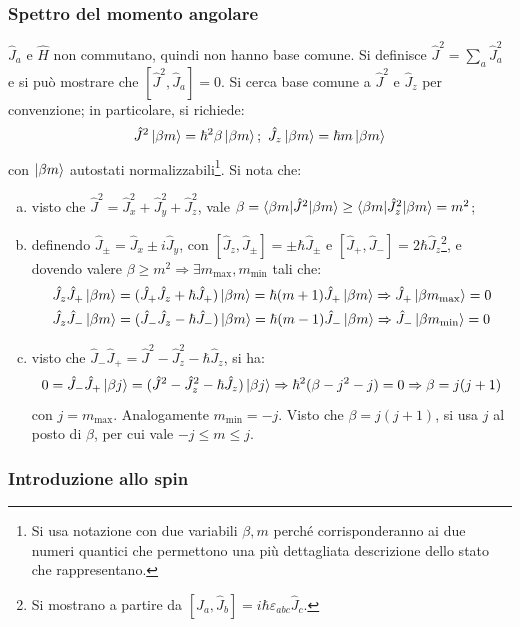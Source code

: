 \documentclass[11pt, a4paper]{scrartcl} %
\numberwithin{equation}{subsection}
\theoremstyle{style2}
\theoremstyle{style1}
\begin{document}
\subsubsection{Spettro del momento angolare}
$\hat{J}_a$ e $\hat{H}$ non commutano, quindi non hanno base comune. Si definisce $\hat{J }^2 = \sum_{a}^{} \hat{J}_a^2 $ e si pu\`o mostrare che $[\hat{J}^2 , \hat{J}_a] = 0$. Si cerca base comune a $\hat{J}^2$ e $\hat{J}_z$ per convenzione; in particolare, si richiede:
\[
\hat{J}^2 \ket{\beta m} = \hbar^2 \beta  \ket{\beta m} ; \ \hat{J}_z \ket{\beta  m}  = \hbar m \ket{\beta  m } 
\] 
con $\ket{\beta m} $ autostati normalizzabili\footnote{Si usa notazione con due variabili $\beta , m$ perch\'e corrisponderanno ai due numeri quantici che permettono una pi\`u dettagliata descrizione dello stato che rappresentano.}. Si nota che:
\begin{enumerate}[(a).]
	\item visto che $\hat{J}^2 = \hat{J}^2_x + \hat{J}^2 _y + \hat{J}^2_z$, vale $\beta = \braket{\beta  m |\hat{J}^2|\beta m} \ge \braket{\beta m|\hat{J}_z^2|\beta  m } = m^2$;
	\item definendo $\hat{J}_{\pm} = \hat{J}_x \pm i\hat{J}_y$, con $[\hat{J}_z , \hat{J}_{\pm} ]=\pm \hbar \hat{J}_{\pm} $ e $[\hat{J}_+, \hat{J}_-] = 2 \hbar \hat{J}_z$\footnote{Si mostrano a partire da $[\hat{J}_a, \hat{J}_b ]= i\hbar  \varepsilon _{abc} \hat{J}_c$.}, e dovendo valere $\beta \ge m^2\Rightarrow \exists m_\text{max}, m_\text{min}$ tali che:
		\[
		\begin{split}
			&\hat{J}_z \hat{J}_+ \ket{\beta  m } = (\hat{J}_+ \hat{J}_z + \hbar \hat{J}_+) \ket{\beta  m}  = \hbar  (m+1) \hat{J}_+ \ket{\beta  m} \Rightarrow \hat{J}_+ \ket{\beta  m_\text{max}} =0\\
			& \hat{J}_z \hat{J}_- \ket{\beta  m } = (\hat{J}_- \hat{J}_z - \hbar \hat{J}_-)\ket{\beta m}  = \hbar  (m-1) \hat{J}_- \ket{\beta m} \Rightarrow \hat{J}_- \ket{\beta  m _\text{min}} =0
		\end{split}
		\] 
	\item visto che $\hat{J}_- \hat{J}_+ = \hat{J}^2 - \hat{J}_z^2 - \hbar \hat{J}_z$, si ha:
		\[
			 0 = \hat{J}_- \hat{J}_+ \ket{\beta  j}  = (\hat{J}^2 - \hat{J}_z^2 - \hbar  \hat{J}_z) \ket{\beta  j } \Rightarrow \hbar ^2 (\beta  - j^2 -j) = 0 \Rightarrow \beta = j(j+1)
		\] 
	con $j= m_\text{max}$. Analogamente $m_\text{min} = - j$. Visto che $\beta  = j(j+1)$, si usa $j$ al posto di $\beta $, per cui vale $-j\le m\le j$.
\end{enumerate}
\subsubsection{Introduzione allo spin}
\end{document}

